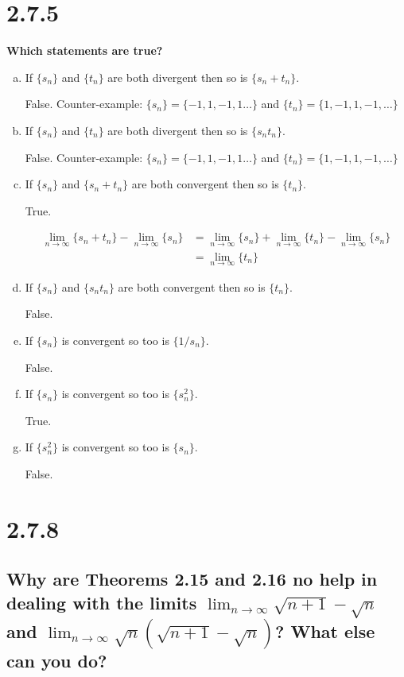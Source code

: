 \documentclass[11pt]{article}
\begin{document}
	\section*{2.7.5}
	\def \mylimit {\lim_{n \to \infty}}
	\textbf{Which statements are true?}
	\begin{enumerate}[(a)]
		\item If $\{s_n\}$ and $\{t_n\}$ are both divergent then so is $\{s_n + t_n\}$.
		
		False. Counter-example: $\{s_n\} = \{-1, 1, -1, 1 \dots\}$ and $\{t_n\} = \{1, -1, 1, -1, \dots\}$
		
		\item If $\{s_n\}$ and $\{t_n\}$ are both divergent then so is $\{s_nt_n\}$.
		
		False. Counter-example: $\{s_n\} = \{-1, 1, -1, 1 \dots\}$ and $\{t_n\} = \{1, -1, 1, -1, \dots\}$
		
		\item If $\{s_n\}$ and $\{s_n + t_n\}$ are both convergent then so is $\{t_n\}$.
		
		True. 
		
		\begin{align*}
		\mylimit{}\{s_n + t_n\} - \mylimit{}\{s_n\} &= \mylimit{}\{s_n\} + \mylimit{}\{t_n\} - \mylimit{}\{s_n\} \tag{By Algebra of Limits}\\
		&= \mylimit{}\{t_n\}
		\end{align*}
		
		\item If $\{s_n\}$ and $\{s_nt_n\}$ are both convergent then so is $\{t_n\}$.
		
		False.
		
		\item If $\{s_n\}$ is convergent so too is $\{1/s_n\}$.
		
		False.
		
		\item If $\{s_n\}$ is convergent so too is $\{s_n^2\}$.
		
		True.
		
		\item If $\{s_n^2\}$ is convergent so too is $\{s_n\}$.
		
		False.
		
	\end{enumerate}
	
	
	\section*{2.7.8}
	\subsection*{Why are Theorems 2.15 and 2.16 no help in dealing with the limits
		$\lim_{n \to \infty} \sqrt{n + 1} {-} \sqrt{n}$ and $\lim_{n \to \infty} \sqrt{n} (\sqrt{n+1} - \sqrt{n})$?
		What else can you do?}
	
	
	
	
	
	
	
	
\end{document}
